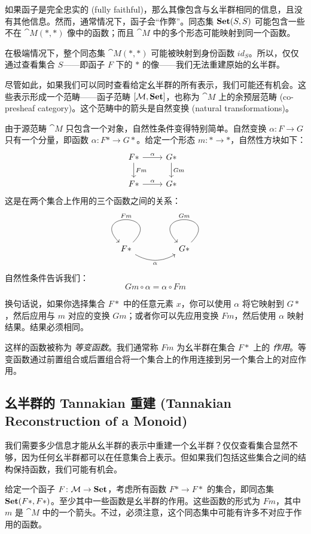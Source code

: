 \documentclass[DaoFP]{subfiles}
\begin{document}
 如果函子是完全忠实的 (fully faithful)，那么其像包含与幺半群相同的信息，且没有其他信息。然而，通常情况下，函子会“作弊”。同态集 $\mathbf{Set} (S, S)$ 可能包含一些不在 $\cat M(*, *)$ 像中的函数；而且 $\cat M$ 中的多个形态可能映射到同一个函数。

 在极端情况下，整个同态集 $\cat M(*, *)$ 可能被映射到身份函数 $id_S$。所以，仅仅通过查看集合 $S$——即函子 $F$ 下的 $*$ 的像——我们无法重建原始的幺半群。

 尽管如此，如果我们可以同时查看给定幺半群的所有表示，我们可能还有机会。这些表示形成一个范畴——函子范畴 $[\mathcal{M}, \mathbf{Set}]$，也称为 $\cat M$ 上的余预层范畴 (co-presheaf category)。这个范畴中的箭头是自然变换 (natural transformations)。

 由于源范畴 $\cat M$ 只包含一个对象，自然性条件变得特别简单。自然变换 $\alpha \colon F \to G$ 只有一个分量，即函数 $\alpha \colon F * \to G *$。给定一个形态 $m \colon * \to *$，自然性方块如下：
 \[
  \begin{tikzcd}
   F *
   \arrow[r, "\alpha"]
   \arrow[d, "F m"]
   & G *
   \arrow[d, "G m"]
   \\
   F *
   \arrow[r, "\alpha"]
   & G *
  \end{tikzcd}
 \]
 这是在两个集合上作用的三个函数之间的关系：
 \[
  \begin{tikzcd}
   F *
   \arrow[loop, "F m"']
   \arrow[rr, bend right, "\alpha"']
   && G *
   \arrow[loop, "G m"']
  \end{tikzcd}
 \]
 自然性条件告诉我们：
 \[ G m \circ \alpha = \alpha \circ F m \]

 换句话说，如果你选择集合 $F *$ 中的任意元素 $x$，你可以使用 $\alpha$ 将它映射到 $G *$，然后应用与 $m$ 对应的变换 $G m$；或者你可以先应用变换 $F m$，然后使用 $\alpha$ 映射结果。结果必须相同。

 这样的函数被称为 \emph{等变函数}。我们通常称 $F m$ 为幺半群在集合 $F *$ 上的 \emph{作用}。等变函数通过前置组合或后置组合将一个集合上的作用连接到另一个集合上的对应作用。

 \subsection{幺半群的 Tannakian 重建 (Tannakian Reconstruction of a Monoid)}

 我们需要多少信息才能从幺半群的表示中重建一个幺半群？仅仅查看集合显然不够，因为任何幺半群都可以在任意集合上表示。但如果我们包括这些集合之间的结构保持函数，我们可能有机会。

 给定一个函子 $F \colon \mathcal{M} \to \mathbf{Set}$，考虑所有函数 $F* \to F*$ 的集合，即同态集 $\mathbf{Set}(F *, F *)$。至少其中一些函数是幺半群的作用。这些函数的形式为 $F m$，其中 $m$ 是 $\cat M$ 中的一个箭头。不过，必须注意，这个同态集中可能有许多不对应于作用的函数。
\end{document}
